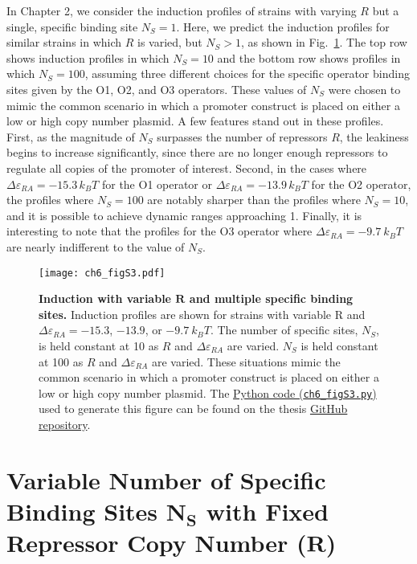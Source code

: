 \documentclass[12pt]{caltech_thesis}
\begin{document}
In Chapter 2, we consider the induction profiles of strains with varying
\(R\) but a single, specific binding site \(N_S = 1\). Here, we predict
the induction profiles for similar strains in which \(R\) is varied, but
\(N_S > 1\), as shown in Fig.~\ref{fig:fugacity_r}. The top row shows
induction profiles in which \(N_S = 10\) and the bottom row shows
profiles in which \(N_S = 100\), assuming three different choices for
the specific operator binding sites given by the O1, O2, and O3
operators. These values of \(N_S\) were chosen to mimic the common
scenario in which a promoter construct is placed on either a low or high
copy number plasmid. A few features stand out in these profiles. First,
as the magnitude of \(N_S\) surpasses the number of repressors \(R\),
the leakiness begins to increase significantly, since there are no
longer enough repressors to regulate all copies of the promoter of
interest. Second, in the cases where
\(\Delta \varepsilon_{RA} = -15.3\,k_B T\) for the O1 operator or
\(\Delta \varepsilon_{RA} = -13.9\,k_B T\) for the O2 operator, the
profiles where \(N_S = 100\) are notably sharper than the profiles where
\(N_S = 10\), and it is possible to achieve dynamic ranges approaching
1. Finally, it is interesting to note that the profiles for the O3
operator where \(\Delta \varepsilon_{RA} = -9.7~k_B T\) are nearly
indifferent to the value of \(N_S\).

\hypertarget{fig:fugacity_r}{%
\begin{figure}
\centering
\texttt{[image: ch6\_figS3.pdf]}
\caption[{Induction with variable \(\boldsymbol{R}\) and multiple
specific binding sites.}]{\textbf{Induction with variable
\(\boldsymbol{R}\) and multiple specific binding sites.} Induction
profiles are shown for strains with variable R and
\(\Delta \varepsilon_{RA} = -15.3\), \(-13.9\), or \(-9.7~k_B T\). The
number of specific sites, \(N_S\), is held constant at 10 as \(R\) and
\(\Delta \varepsilon_{RA}\) are varied. \(N_S\) is held constant at 100
as \(R\) and \(\Delta \varepsilon_{RA}\) are varied. These situations
mimic the common scenario in which a promoter construct is placed on
either a low or high copy number plasmid. The
\href{https://github.com/gchure/phd/blob/master/src/chapter_06/code/ch6_figS3.py}{Python
code (\texttt{ch6\_figS3.py})} used to generate this figure can be found
on the thesis \href{https://github.com/gchure/phd}{GitHub repository}.}
\label{fig:fugacity_r}
\end{figure}
}

\hypertarget{variable-number-of-specific-binding-sites-boldsymboln_s-with-fixed-repressor-copy-number-boldsymbolr}{%
\section{\texorpdfstring{Variable Number of Specific Binding Sites
\(\boldsymbol{N_S}\) with Fixed Repressor Copy Number
(\(\boldsymbol{R}\))}{Variable Number of Specific Binding Sites \textbackslash boldsymbol\{N\_S\} with Fixed Repressor Copy Number (\textbackslash boldsymbol\{R\})}}\label{variable-number-of-specific-binding-sites-boldsymboln_s-with-fixed-repressor-copy-number-boldsymbolr}}
\end{document}
